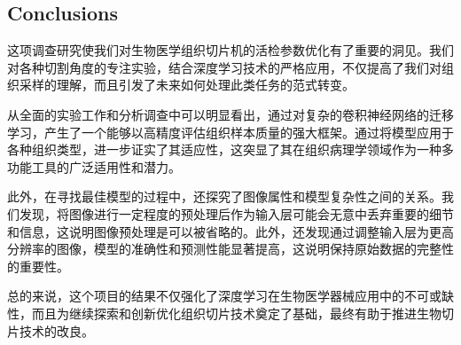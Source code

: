 \subsection{Conclusions}

这项调查研究使我们对生物医学组织切片机的活检参数优化有了重要的洞见。我们对各种切割角度的专注实验，结合深度学习技术的严格应用，不仅提高了我们对组织采样的理解，而且引发了未来如何处理此类任务的范式转变。

从全面的实验工作和分析调查中可以明显看出，通过对复杂的卷积神经网络的迁移学习，产生了一个能够以高精度评估组织样本质量的强大框架。通过将模型应用于各种组织类型，进一步证实了其适应性，这突显了其在组织病理学领域作为一种多功能工具的广泛适用性和潜力。

此外，在寻找最佳模型的过程中，还探究了图像属性和模型复杂性之间的关系。我们发现，将图像进行一定程度的预处理后作为输入层可能会无意中丢弃重要的细节和信息，这说明图像预处理是可以被省略的。此外，还发现通过调整输入层为更高分辨率的图像，模型的准确性和预测性能显著提高，这说明保持原始数据的完整性的重要性。


总的来说，这个项目的结果不仅强化了深度学习在生物医学器械应用中的不可或缺性，而且为继续探索和创新优化组织切片技术奠定了基础，最终有助于推进生物切片技术的改良。








\FloatBarrier %